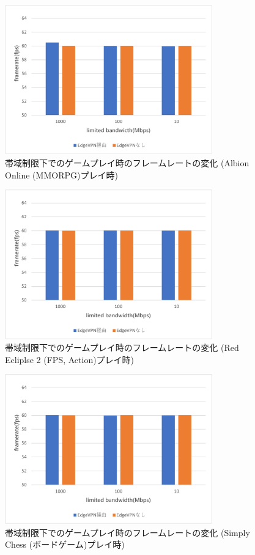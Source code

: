 \begin{figure}[t]
    \centering
    \includegraphics[width=0.8\textwidth,keepaspectratio,clip]{img/framerate_MMO.pdf}
    \caption{帯域制限下でのゲームプレイ時のフレームレートの変化 (Albion Online (MMORPG)プレイ時)}
    \label{fig:fps_mmo}
\end{figure}

\begin{figure}[t]
    \centering
    \includegraphics[width=0.8\textwidth,keepaspectratio,clip]{img/framerate_FPS.pdf}
    \caption{帯域制限下でのゲームプレイ時のフレームレートの変化 (Red Ecliplse 2 (FPS, Action)プレイ時)}
    \label{fig:fps_fps}
\end{figure}

\begin{figure}[t]
    \centering
    \includegraphics[width=0.8\textwidth,keepaspectratio,clip]{img/framerate_Board.pdf}
    \caption{帯域制限下でのゲームプレイ時のフレームレートの変化 (Simply Chess (ボードゲーム)プレイ時)}
    \label{fig:fps_board}
\end{figure}

